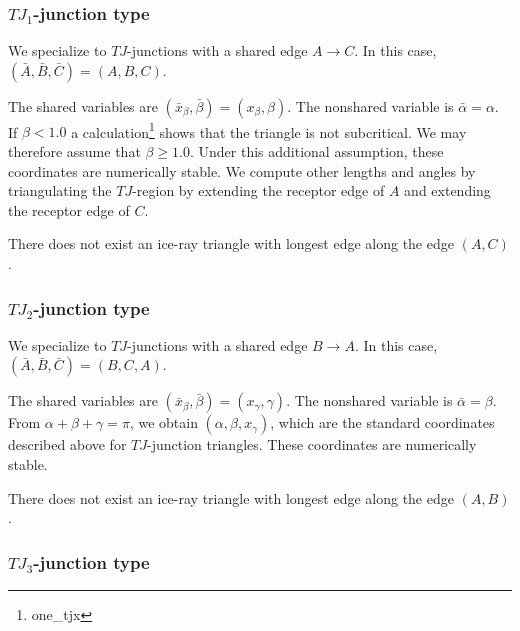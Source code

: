
\subsubsection{$TJ_1$-junction type}

We specialize to $TJ$-junctions with a shared edge $A\to C$.  In this
case, $(\bar A,\bar B,\bar C)=(A,B,C)$.

The shared variables are $(\bar x_\beta,\bar\beta)=(x_\beta,\beta)$.
The nonshared variable is $\bar\alpha=\alpha$.  If $\beta < 1.0$ a
calculation\footnote{one\_tjx} shows that the triangle is not
subcritical.  We may therefore assume that $\beta \ge 1.0$.  Under
this additional assumption, these coordinates are numerically stable.
We compute other lengths and angles by triangulating the $TJ$-region
by extending the receptor edge of $A$ and extending the receptor edge
of $C$.

There does not exist an ice-ray triangle with longest edge along the
edge $(A,C)$.

\subsubsection{$TJ_2$-junction type}

We specialize to $TJ$-junctions with a shared edge $B\to A$. In this
case, $(\bar A,\bar B,\bar C)=(B,C,A)$.

The shared variables are $(\bar x_\beta,\bar\beta)=(x_\gamma,\gamma)$.
The nonshared variable is $\bar\alpha =\beta$.  From
$\alpha+\beta+\gamma=\pi$, we obtain $(\alpha,\beta,x_\gamma)$, which
are the standard coordinates described above for $TJ$-junction
triangles.  These coordinates are numerically stable.

There does not exist an ice-ray triangle with longest edge along the
edge $(A,B)$.

\subsubsection{$TJ_3$-junction type}

